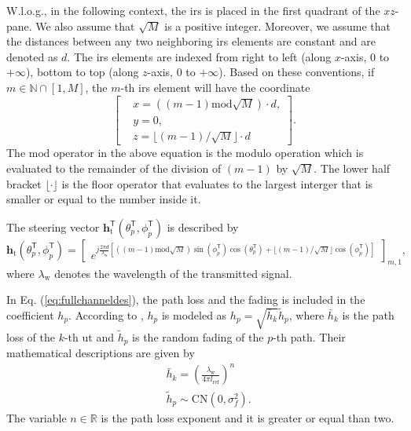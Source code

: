 \documentclass[12pt,draftclsnofoot,onecolumn,journal]{IEEEtran}
\begin{document}
W.l.o.g., in the following context, the \ac{irs} is placed in the first quadrant of the $xz$-pane. We also assume that $\sqrt M$ is a positive integer. Moreover, we assume that the distances between any two neighboring \ac{irs} elements are constant and are denoted as $d$. The \ac{irs} elements are indexed from right to left (along $x$-axis, $0$ to $+\infty$), bottom to top (along $z$-axis, $0$ to $+\infty$). Based on these conventions, if $m\in \mathbb N \cap [1, M]$, the $m$-th \ac{irs} element will have the coordinate 
\begin{equation}
\begin{bmatrix}
&x=((m-1) \mathrm{mod} \sqrt M)\cdot d, \\
&y=0, \\
&z=\lfloor(m-1)/\sqrt M\rfloor \cdot d
\end{bmatrix}.
\label{eq:coodinateofthemthelem}
\end{equation}
The $\mathrm{mod}$ operator in the above equation is the modulo operation which is evaluated to the remainder of the division of $(m-1)$ by $\sqrt M$. 
The lower half bracket $\lfloor\cdot\rfloor$ is the floor operator that evaluates to the largest interger that is smaller or equal to the number inside it.


The steering vector $\mathbf h_{\mathrm t}^{\mathsf{T}}(\theta_p^{\mathsf{T}}, \phi_p^{\mathsf{T}})$ is described by
\begin{equation}
\mathbf h_{\mathrm t}(\theta_p^{\mathsf{T}}, \phi_p^{\mathsf{T}})=\begin{bmatrix}
e^{j\frac{2\pi d}{\lambda_{\mathrm w}}[((m-1) \mathrm{mod} \sqrt M)\sin(\phi_p^{\mathsf{T}})\cos(\theta_p^{\mathsf{T}})+\lfloor(m-1)/\sqrt M\rfloor\cos(\phi_p^{\mathsf{T}})]}
\end{bmatrix}_{m,1},
\end{equation}
where $\lambda_{\mathrm w}$ denotes the wavelength of the transmitted signal.

In Eq. (\ref{eq:fullchanneldes}), the path loss and the fading is included in the coefficient $h_p$. According to \cite{jamali2020intelligent}, $h_p$ is modeled as $h_p=\sqrt{\bar h_k}\tilde h_p$, where $\bar h_k$ is the path loss of the $k$-th \ac{ut} and $\tilde h_p$ is the random fading of the $p$-th path. Their mathematical descriptions are given by
\begin{equation}
\begin{split}
&\bar h_k=\left(\frac{\lambda_{\mathrm w}}{4\pi l_{\mathrm{ref}}}\right)^n\\
&\tilde h_p\sim\mathrm{CN}(0, \sigma_f^2).
\end{split}
\end{equation}
The variable $n\in \mathbb R$ is the path loss exponent and it is greater or equal than two.  
\end{document}
